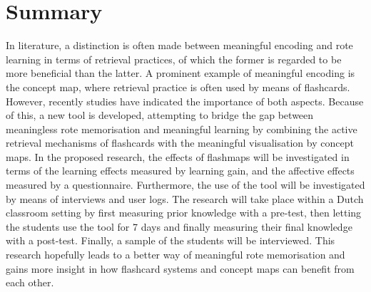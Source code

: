 \chapter{Summary}

In literature, a distinction is often made between meaningful encoding and rote learning in terms of retrieval practices, of which the former is regarded to be more beneficial than the latter. A prominent example of meaningful encoding is the concept map, where retrieval practice is often used by means of flashcards. However, recently studies have indicated the importance of both aspects. Because of this, a new tool is developed, attempting to bridge the gap between meaningless rote memorisation and meaningful learning by combining the active retrieval mechanisms of flashcards with the meaningful visualisation by concept maps. In the proposed research, the effects of flashmaps will be investigated in terms of the learning effects measured by learning gain, and the affective effects measured by a questionnaire. Furthermore, the use of the tool will be investigated by means of interviews and user logs. The research will take place within a Dutch classroom setting by first measuring prior knowledge with a pre-test, then letting the students use the tool for 7 days and finally measuring their final knowledge with a post-test. Finally, a sample of the students will be interviewed. This research hopefully leads to a better way of meaningful rote memorisation and gains more insight in how flashcard systems and concept maps can benefit from each other.
